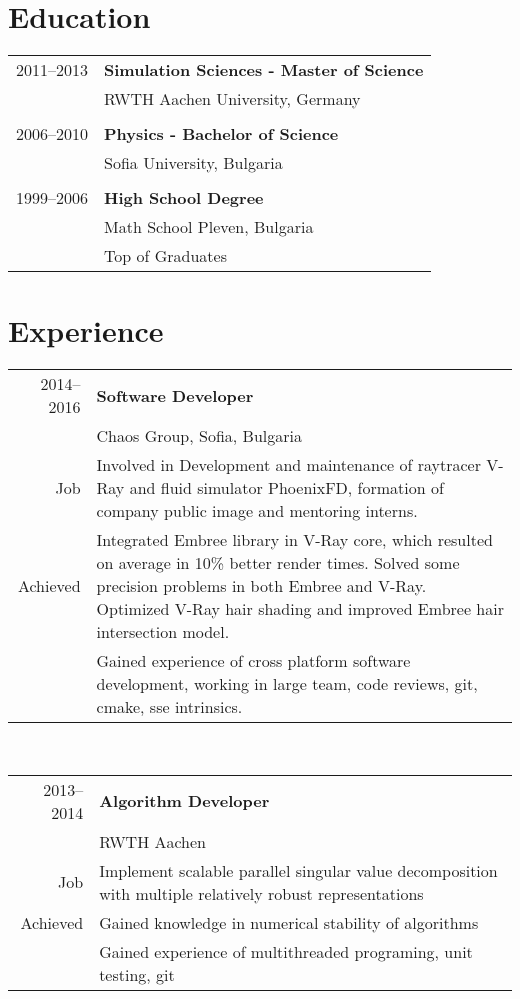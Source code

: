 \section*{Education}
\begin{tabular}{ l l }
2011--2013  & \textbf{Simulation Sciences - Master of Science}\\
            & RWTH Aachen University, Germany\\
& \\
2006--2010  & \textbf{Physics - Bachelor of Science}\\
            & Sofia University, Bulgaria\\ 
& \\
1999--2006  & \textbf{High School Degree}\\    
            & Math School Pleven, Bulgaria\\
            &Top of Graduates\\
\end{tabular}
\section*{Experience}
\begin{tabular}{ r p{} }
2014--2016 & \textbf{Software Developer} \\
           & Chaos Group, Sofia, Bulgaria\\
Job        & Involved in Development and maintenance of raytracer V-Ray and fluid simulator PhoenixFD, formation of company public image and mentoring interns.\\
Achieved   & Integrated Embree library in V-Ray core, which resulted on average in 10\% better render times. Solved some precision problems in both Embree and V-Ray. Optimized V-Ray hair shading and improved Embree hair intersection model. \\
           & Gained experience of cross platform software development, working in large team, code reviews, git, cmake, sse intrinsics. 
\end{tabular}\\
\begin{tabular}{ r p{} }
2013--2014 & \textbf{Algorithm Developer} \\
           & RWTH Aachen\\
Job        & Implement scalable parallel singular value decomposition with multiple relatively robust representations \\
Achieved   & Gained knowledge in numerical stability of algorithms\\
           & Gained experience of multithreaded programing, unit testing, git\\
\end{tabular}\\

